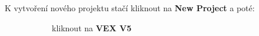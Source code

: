 \documentclass[main.tex]{subfiles}
\begin{document}
	K vytvoření nového projektu stačí kliknout na \textbf{New Project} a poté:

	\begin{figure}[h!]%
		\begin{subfigure}[t]{.3\textwidth}%
			\centering%
			\caption{kliknout na \textbf{VEX V5}}%
		\end{subfigure} \hspace{.045\textwidth}%
		\begin{subfigure}[t]{.3\textwidth}%
			\centering%

\end{subfigure}
\end{figure}
\end{document}
